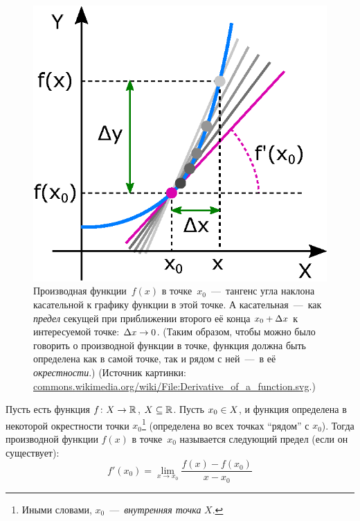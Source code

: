 \documentclass[a4paper,12pt]{article}
\begin{document}
  \begin{figure}[ht]
    \centering
    \includegraphics[width=0.8\linewidth]{images/Derivative_of_a_function}
    
    \caption{
      Производная функции~$f(x)$ в точке~$x_0$~---~тангенс угла наклона касательной к графику функции в этой точке.
      А касательная~---~как \emph{предел} секущей при приближении второго её конца $x_0 \hm+ \Dt x$ к интересуемой точке: $\Dt x \hm\to 0$.
      (Таким образом, чтобы можно было говорить о производной функции в точке, функция должна быть определена как в самой точке, так и рядом с ней~---~в её \emph{окрестности}.)
      (Источник картинки: \href{https://commons.wikimedia.org/wiki/File:Derivative\_of\_a\_function.svg}{commons.wikimedia.org/wiki/File:Derivative\_of\_a\_function.svg}.)
    }
    \label{fig:derivative}
  \end{figure}
  
  Пусть есть функция $f\hm\colon X \hm\to \RR$, $X \hm\subseteq \RR$.
  Пусть $x_0 \hm\in X$, и функция определена в некоторой окрестности точки $x_0$\footnote{Иными словами, $x_0$~---~\emph{внутренняя точка} $X$.} (определена во всех точках ``рядом'' с $x_0$).
  Тогда производной функции $f(x)$ в точке~$x_0$ называется следующий предел (если он существует):
  \[
    f'(x_0) = \lim_{x \to x_0} \frac{f(x) - f(x_0)}{x - x_0}
  \]
  
\end{document}
